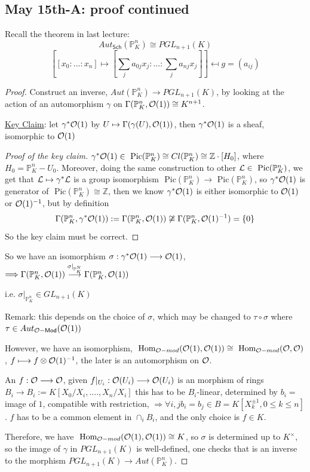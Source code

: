 \documentclass[11pt]{article}
\theoremstyle{definition}
\renewcommand{\hom}{\text{ Hom}}
\newcommand{\pic}{\text{ Pic}}
\newcommand{\proj}{\mathbb P}
\newcommand{\intg}{\mathbb Z}
\newcommand{\call}{{\cal L}}
\newcommand{\calo}{{\cal O}}
\newcommand{\Lrta}{\Longrightarrow}
\newcommand{\lrta}{\longrightarrow}
\begin{document}
\subsection{May 15th-A: proof continued}
Recall the theorem in last lecture:
$$
Aut_{\mathsf{Sch}}(\proj^n_K)\cong PGL_{n+1}(K)
$$
$$
\left[[x_0:...:x_n]\mapsto \left[\sum_j a_{0j}x_j:...:\sum_j a_{nj}x_j\right]\right]\mapsfrom g=(a_{ij})
$$
\begin{proof}
Construct an inverse, $Aut(\proj^n_K)\lrta PGL_{n+1}(K)$, by looking at the action of an automorphism $\gamma$ on $\Gamma(\proj^n_K,\calo(1))\cong K^{n+1}$.

\underline{Key Claim}: let $\gamma^*\calo(1)$
 by $U\mapsto \Gamma(\gamma(U),\calo(1))$, then $\gamma^*\calo(1)$ is a sheaf, isomorphic to $\calo(1)$
\begin{proof}[Proof of the key claim]
$\gamma^*\calo(1)\in \pic(\proj^n_K)\cong Cl(\proj^n_K)\cong \intg\cdot [H_0]$, where $H_0=\proj^n_K-U_0$.  Moreover, doing the same construction to other $\call\in \pic(\proj^n_K)$, we get that $\call\mapsto \gamma^*\call$ is a group isomorphism $\pic(\proj^n_K)\lrta \pic(\proj^n_K)$, so $\gamma^*\calo(1)$ is generator of $\pic(\proj^n_K)\cong \intg$, then we know $\gamma^*\calo(1)$ is either isomorphic to $\calo(1)$ or $\calo(1)^{-1}$, but by definition
$$
\Gamma(\proj^n_K,\gamma^*\calo(1)):=\Gamma(\proj^n_K,\calo(1))\not\cong \Gamma(\proj^n_K,\calo(1)^{-1})=\{0\}
$$
So the key claim must be correct.
\end{proof}

So we have an isomorphism $\sigma:\gamma^*\calo(1)\lrta \calo(1)$, $\Lrta \Gamma(\proj^n_K,\calo(1))\overset{\sigma|_{\proj^N_K}}{\lrta}\Gamma(\proj^n_K,\calo(1))$

i.e. $\sigma|_{\proj^n_K}\in GL_{n+1}(K)$

Remark: this depends on the choice of $\sigma$, which may be changed to $\tau\circ \sigma$ where $\tau\in Aut_{\calo-\mathsf{Mod}}(\calo(1))$

However, we have an isomorphism, $\hom_{\calo-mod}(\calo(1),\calo(1))\cong \hom_{\calo-mod}(\calo,\calo)$, $f\longmapsto f\otimes\calo(1)^{-1}$, the later is an automorphism on $\calo$.

An $f:\calo\lrta\calo$, given $f|_{U_i}:\calo(U_i)\lrta\calo(U_i)$ is an  morphism of rings $B_i\lrta B_i:=K[X_0/X_i,....,X_n/X_i]$ this has to be $B_i$-linear, determined by $b_i=$image of $1$, compatible with restriction, $\Lrta \forall i,j b_i=b_j\in B=K[X_k^{\pm 1}, 0\leq k\leq n]$. $f$ has to be a common element in $\cap_{i} B_i$, and the only choice is $f\in K$.

Therefore, we have $\hom_{\calo-mod}(\calo(1),\calo(1))\cong K$, so $\sigma$ is determined up to $K^\times$, so the image of $\gamma$ in $PGL_{n+1}(K)$ is well-defined, one checks that is an inverse to the morphism $PGL_{n+1}(K)\lrta Aut(\proj^n_K)$.
 \end{proof}
\end{document}
